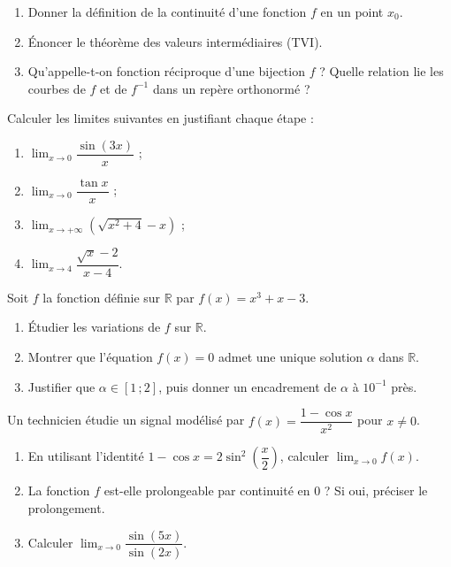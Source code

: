\documentclass[11pt]{article}
\newcounter{popsec}
\newcounter{popsub}
\newcommand{\courssub}[1]{%
  \stepcounter{popsub}%
  \par\vspace{9pt}\noindent{\popxbold\fontsize{11.5}{13}\selectfont\color{popink}{\color{poporange}\thepopsec.\thepopsub}\hspace{6pt}#1}\par\nopagebreak\vspace{4pt}
}
\begin{document}
\begin{exercice}[Définitions]
\begin{enumerate}
\item Donner la définition de la continuité d'une fonction $f$ en un point $x_0$.
\item Énoncer le théorème des valeurs intermédiaires (TVI).
\item Qu'appelle-t-on fonction réciproque d'une bijection $f$ ? Quelle relation lie les courbes de $f$ et de $f^{-1}$ dans un repère orthonormé ?
\end{enumerate}
\end{exercice}

\begin{exercice}
Calculer les limites suivantes en justifiant chaque étape :
\begin{enumerate}
\item $\displaystyle\lim_{x\to 0}\dfrac{\sin(3x)}{x}$ ;
\item $\displaystyle\lim_{x\to 0}\dfrac{\tan x}{x}$ ;
\item $\displaystyle\lim_{x\to +\infty}\left(\sqrt{x^2+4}-x\right)$ ;
\item $\displaystyle\lim_{x\to 4}\dfrac{\sqrt{x}-2}{x-4}$.
\end{enumerate}
\end{exercice}

\courssub{Je m'entraîne}

\begin{exercice}
Soit $f$ la fonction définie sur $\mathbb{R}$ par $f(x)=x^3+x-3$.
\begin{enumerate}
\item Étudier les variations de $f$ sur $\mathbb{R}$.
\item Montrer que l'équation $f(x)=0$ admet une unique solution $\alpha$ dans $\mathbb{R}$.
\item Justifier que $\alpha\in[1\,;2]$, puis donner un encadrement de $\alpha$ à $10^{-1}$ près.
\end{enumerate}
\end{exercice}

\begin{exercice}
Un technicien étudie un signal modélisé par $f(x)=\dfrac{1-\cos x}{x^2}$ pour $x\neq 0$.
\begin{enumerate}
\item En utilisant l'identité $1-\cos x=2\sin^2\!\left(\dfrac{x}{2}\right)$, calculer $\displaystyle\lim_{x\to 0}f(x)$.
\item La fonction $f$ est-elle prolongeable par continuité en $0$ ? Si oui, préciser le prolongement.
\item Calculer $\displaystyle\lim_{x\to 0}\dfrac{\sin(5x)}{\sin(2x)}$.
\end{enumerate}
\end{exercice}
\end{document}
